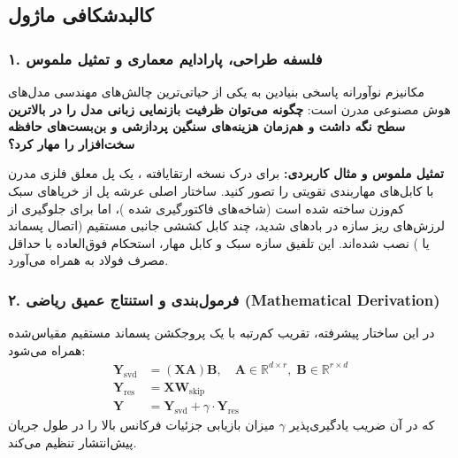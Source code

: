 \subsection{کالبدشکافی ماژول }

\subsubsection*{۱. فلسفه طراحی، پارادایم معماری و تمثیل ملموس}
مکانیزم نوآورانه  پاسخی بنیادین به یکی از حیاتی‌ترین چالش‌های مهندسی مدل‌های هوش مصنوعی مدرن است: \textbf{چگونه می‌توان ظرفیت بازنمایی زبانی مدل را در بالاترین سطح نگه داشت و هم‌زمان هزینه‌های سنگین پردازشی و بن‌بست‌های حافظه سخت‌افزار را مهار کرد؟}

\textbf{تمثیل ملموس و مثال کاربردی:}
برای درک نسخه ارتقایافته ، یک پل معلق فلزی مدرن با کابل‌های مهاربندی تقویتی را تصور کنید. ساختار اصلی عرشه پل از خرپاهای سبک کم‌وزن ساخته شده است (شاخه‌های فاکتورگیری شده )، اما برای جلوگیری از لرزش‌های ریز سازه در بادهای شدید، چند کابل کششی جانبی مستقیم (اتصال پسماند یا ) نصب شده‌اند. این تلفیق سازه سبک و کابل مهار، استحکام فوق‌العاده با حداقل مصرف فولاد به همراه می‌آورد.

\subsubsection*{۲. فرمول‌بندی و استنتاج عمیق ریاضی (Mathematical Derivation)}
در این ساختار پیشرفته، تقریب کم‌رتبه با یک پروجکشن پسماند مستقیم مقیاس‌شده همراه می‌شود:
\begin{align}
\mathbf{Y}_{\text{svd}} &= (\mathbf{X} \mathbf{A}) \mathbf{B}, \quad \mathbf{A} \in \mathbb{R}^{d \times r}, \; \mathbf{B} \in \mathbb{R}^{r \times d} \\
\mathbf{Y}_{\text{res}} &= \mathbf{X} \mathbf{W}_{\text{skip}} \\
\mathbf{Y} &= \mathbf{Y}_{\text{svd}} + \gamma \cdot \mathbf{Y}_{\text{res}}
\end{align}
که در آن ضریب یادگیری‌پذیر $\gamma$ میزان بازیابی جزئیات فرکانس بالا را در طول جریان پیش‌انتشار تنظیم می‌کند.

